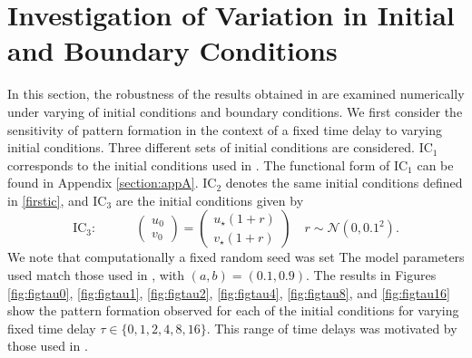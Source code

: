 \section{Investigation of Variation in Initial and Boundary Conditions}
In this section, the robustness of the results obtained in \cite{gaffmonk} are examined numerically under varying of initial conditions and boundary conditions. We first consider the sensitivity of pattern formation in the context of a fixed time delay to varying initial conditions. Three different sets of initial conditions are considered. $\text{IC}_1$ corresponds to the initial conditions used in \cite{gaffmonk}. The functional form of $\text{IC}_1$ can be found in Appendix \ref{section:appA}. $\text{IC}_2$ denotes the same initial conditions defined in \eqref{firstic}, and $\text{IC}_3$ are the initial conditions given by
\begin{equation}\label{ic3}
\text{IC}_3:\quad\quad\quad\begin{pmatrix}u_0\\v_0\end{pmatrix}=\begin{pmatrix}u_\star(1+r)\\v_\star(1+r)\end{pmatrix}\quad r\sim\mathcal{N}\left(0,0.1^2\right).
\end{equation}
We note that computationally a fixed random seed was set The model parameters used match those used in \cite{gaffmonk}, with $(a,b)=(0.1,0.9)$. The results in Figures \ref{fig:figtau0}, \ref{fig:figtau1}, \ref{fig:figtau2}, \ref{fig:figtau4}, \ref{fig:figtau8}, and \ref{fig:figtau16} show the pattern formation observed for each of the initial conditions for varying fixed time delay $\tau\in\{0,1,2,4,8,16 \}$. This range of time delays was motivated by those used in \cite{gaffmonk}.

